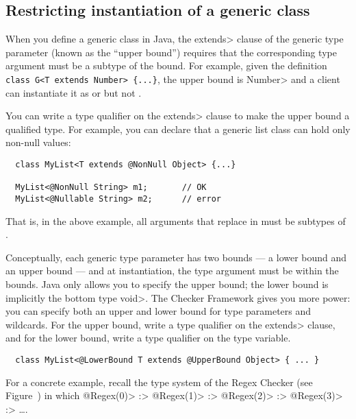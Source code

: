 \subsection{Restricting instantiation of a generic class\label{generics-instantiation}}

When you define a generic class in Java, the \<extends> clause
of the generic type parameter (known as the ``upper bound'') requires that
the corresponding type argument must be a subtype of the bound.
For example, given the definition
\verb|class G<T extends Number> {...}|,
the upper bound is \<Number>
and a client can instantiate it as  or 
but not .

You can write a type qualifier on the \<extends> clause to make the upper
bound a qualified type.  For example, you can declare that a generic list class can hold only non-null values:

\begin{Verbatim}
  class MyList<T extends @NonNull Object> {...}

  MyList<@NonNull String> m1;       // OK
  MyList<@Nullable String> m2;      // error
\end{Verbatim}

That is, in the above example, all
arguments that replace  in  must be subtypes of
.

Conceptually, each generic type parameter has two bounds --- a lower bound
and an upper bound --- and at instantiation, the type argument must be
within the bounds.  Java only allows you to specify the upper bound; the
lower bound is implicitly the bottom type \<void>.  The Checker Framework
gives you more power:  you can specify both an upper and lower bound for
type parameters and wildcards.  For the upper bound, write a type qualifier
on the \<extends> clause, and for the lower bound, write a type qualifier
on the type variable.

\begin{Verbatim}
  class MyList<@LowerBound T extends @UpperBound Object> { ... }
\end{Verbatim}

For a concrete example, recall the type system of the Regex Checker (see
Figure~) in which
 \<@Regex(0)> :>
 \<@Regex(1)> :>
 \<@Regex(2)> :>
 \<@Regex(3)> :> \ldots.

